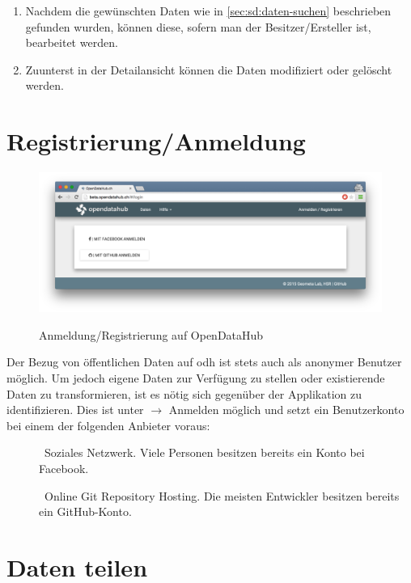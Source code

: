 \begin{enumerate}
\item Nachdem die gewünschten Daten wie in \cref{sec:sd:daten-suchen} beschrieben gefunden wurden, können diese, sofern man der Besitzer/Ersteller ist, bearbeitet werden.
\item Zuunterst in der Detailansicht können die Daten modifiziert oder gelöscht werden.
\end{enumerate}


\section{Registrierung/Anmeldung}
\label{sec:sd:anmeldung}

\begin{figure}[H]
	\centering
	\includegraphics[width=\linewidth]{fig/screenshot-anmelden}
	\label{fig:sd:screenshot-anmelden}
	\caption{Anmeldung/Registrierung auf OpenDataHub}
\end{figure}

Der Bezug von öffentlichen Daten auf \acl{odh} ist stets auch als anonymer Benutzer möglich. Um jedoch eigene Daten zur Verfügung zu stellen oder existierende Daten zu transformieren, ist es nötig sich gegenüber der Applikation zu identifizieren. Dies ist unter  $\to$ Anmelden möglich und setzt ein Benutzerkonto bei einem der folgenden Anbieter voraus:

\begin{description}
\item[] \textendash\ Soziales Netzwerk. Viele Personen besitzen bereits ein Konto bei Facebook.
\item[] \textendash\ Online Git Repository Hosting. Die meisten Entwickler besitzen bereits ein GitHub-Konto.
\end{description}


\section{Daten teilen}

